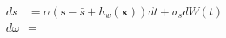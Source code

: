 \begin{align}
    ds &= \alpha(s-\bar{s}+h_w(\mathbf x)) dt + \sigma_s dW(t) \\
    d\omega &=
\end{align}